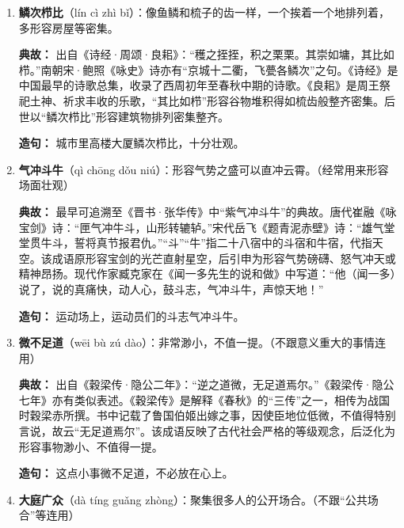 \begin{enumerate}[leftmargin=*]
    \textbf{典故：} “排衙”原指旧时官署陈设仪仗，全署属吏依次参谒长官的仪式。现代作家臧克家在《闻一多先生的说和做》中描写闻一多：“他的以十万百万字计的手稿，都是密密麻麻写得工工整整的蝇头小楷，好像群蚁排衙。”闻一多（1899—1946），现代著名诗人、学者、民主战士。他治学极为严谨，数十年如一日地从事中国古典文学研究，留下了大量工整的手稿。臧克家以“群蚁排衙”形容其手稿的整齐有序，形象地展现了闻一多一丝不苟的治学精神。
    
    \textbf{造句：} 工人们将货物码放得整整齐齐，如群蚁排衙。

    \item \textbf{鳞次栉比}（lín cì zhì bǐ）：像鱼鳞和梳子的齿一样，一个挨着一个地排列着，多形容房屋等密集。
    
    \textbf{典故：} 出自《诗经·周颂·良耜》：“穫之挃挃，积之栗栗。其崇如墉，其比如栉。”南朝宋·鲍照《咏史》诗亦有“京城十二衢，飞甍各鳞次”之句。《诗经》是中国最早的诗歌总集，收录了西周初年至春秋中期的诗歌。《良耜》是周王祭祀土神、祈求丰收的乐歌，“其比如栉”形容谷物堆积得如梳齿般整齐密集。后世以“鳞次栉比”形容建筑物排列密集整齐。
    
    \textbf{造句：} 城市里高楼大厦鳞次栉比，十分壮观。

    \item \textbf{气冲斗牛}（qì chōng dǒu niú）：形容气势之盛可以直冲云霄。（经常用来形容场面壮观）
    
    \textbf{典故：} 最早可追溯至《晋书·张华传》中“紫气冲斗牛”的典故。唐代崔融《咏宝剑》诗：“匣气冲牛斗，山形转辘轳。”宋代岳飞《题青泥赤壁》诗：“雄气堂堂贯牛斗，誓将真节报君仇。”“斗”“牛”指二十八宿中的斗宿和牛宿，代指天空。该成语原形容宝剑的光芒直射星空，后引申为形容气势磅礴、怒气冲天或精神昂扬。现代作家臧克家在《闻一多先生的说和做》中写道：“他（闻一多）说了，说的真痛快，动人心，鼓斗志，气冲斗牛，声惊天地！”
    
    \textbf{造句：} 运动场上，运动员们的斗志气冲斗牛。

    \item \textbf{微不足道}（wēi bù zú dào）：非常渺小，不值一提。（不跟意义重大的事情连用）
    
    \textbf{典故：} 出自《穀梁传·隐公二年》：“逆之道微，无足道焉尔。”《穀梁传·隐公七年》亦有类似表述。《穀梁传》是解释《春秋》的“三传”之一，相传为战国时穀梁赤所撰。书中记载了鲁国伯姬出嫁之事，因使臣地位低微，不值得特别言说，故云“无足道焉尔”。该成语反映了古代社会严格的等级观念，后泛化为形容事物渺小、不值得一提。
    
    \textbf{造句：} 这点小事微不足道，不必放在心上。

    \item \textbf{大庭广众}（dà tíng guǎng zhòng）：聚集很多人的公开场合。（不跟“公共场合”等连用）
    

\end{enumerate}
